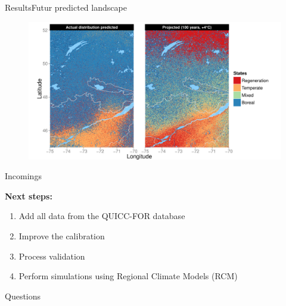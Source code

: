 \documentclass[10pt,aspectratio=149]{beamer}
\begin{document}
\begin{frame}[t]{Results}{Futur predicted landscape}

		\begin{figure}
			\vspace{-1.5em}
			\includegraphics[height=0.79\paperheight]{Figs/outModel.pdf}
		\end{figure}

\end{frame}



\begin{frame}{Incomings}

\textbf{Next steps:}
\begin{enumerate}
	\item Add all data from the QUICC-FOR database
	\item Improve the calibration
	\item Process validation 
	\item Perform simulations using Regional Climate Models (RCM)
\end{enumerate}

\end{frame}


\begin{frame}[plain]{Questions}



\end{frame}

\end{document}
